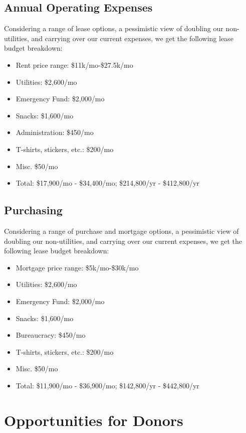 \documentclass[12pt]{article}
\begin{document}
\subsection{Annual Operating Expenses}

Considering a range of lease options, a pessimistic view of doubling our non-utilities, and carrying over our current expenses, we get the following lease budget breakdown:

\begin{itemize}
    \item Rent price range: \$11k/mo-\$27.5k/mo
    \item Utilities: \$2,600/mo
    \item Emergency Fund: \$2,000/mo
    \item Snacks: \$1,600/mo
    \item Administration: \$450/mo
    \item T-shirts, stickers, etc.: \$200/mo
    \item Misc. \$50/mo
    \item Total: \$17,900/mo - \$34,400/mo; \$214,800/yr - \$412,800/yr
\end{itemize}

\subsection{Purchasing}

Considering a range of purchase and mortgage options, a pessimistic view of doubling our non-utilities, and carrying over our current expenses, we get the following lease budget breakdown:

\begin{itemize}
    \item Mortgage price range: \$5k/mo-\$30k/mo
    \item Utilities: \$2,600/mo
    \item Emergency Fund: \$2,000/mo
    \item Snacks: \$1,600/mo
    \item Bureaucracy: \$450/mo
    \item T-shirts, stickers, etc.: \$200/mo
    \item Misc. \$50/mo
    \item Total: \$11,900/mo - \$36,900/mo;  \$142,800/yr - \$442,800/yr
\end{itemize}

\section{Opportunities for Donors}
\end{document}
